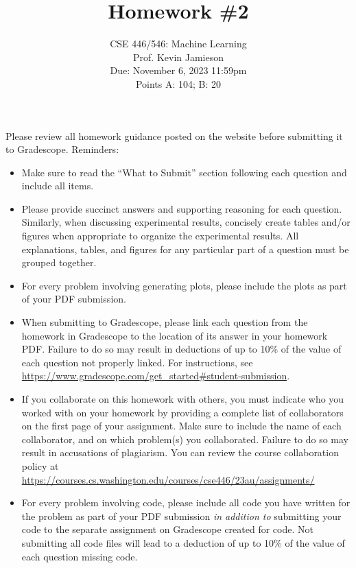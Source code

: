 \documentclass{article}
\begin{document}
\setcounter{aprob}{0}
\title{Homework \#2}
\author{
    \normalsize{CSE 446/546: Machine Learning}\\
    \normalsize{Prof. Kevin Jamieson}\\
    \normalsize{Due: November 6, 2023 11:59pm}\\
    \normalsize{Points A: 104; B: 20}
}
\date{{}}
\maketitle

\noindent Please review all homework guidance posted on the website before submitting it to Gradescope. Reminders:
\begin{itemize}
    \item Make sure to read the ``What to Submit'' section following each question and include all items.
    \item Please provide succinct answers and supporting reasoning for each question. Similarly, when discussing experimental results, concisely create tables and/or figures when appropriate to organize the experimental results. All explanations, tables, and figures for any particular part of a question must be grouped together.
    \item For every problem involving generating plots, please include the plots as part of your PDF submission.
    \item When submitting to Gradescope, please link each question from the homework in Gradescope to the location of its answer in your homework PDF. Failure to do so may result in deductions of up to 10\% of the value of each question not properly linked. For instructions, see \url{https://www.gradescope.com/get_started#student-submission}.
    \item If you collaborate on this homework with others, you must indicate who you worked with on your homework by providing a complete list of collaborators on the first page of your assignment. Make sure to include the name of each collaborator, and on which problem(s) you collaborated. Failure to do so may result in accusations of plagiarism. You can review the course collaboration policy at \url{https://courses.cs.washington.edu/courses/cse446/23au/assignments/}
    \item For every problem involving code, please include all code you have written for the problem as part of your PDF submission \emph{in addition to} submitting your code to the separate assignment on Gradescope created for code. Not submitting all code files will lead to a deduction of up to 10\% of the value of each question missing code.  
\end{itemize}
\end{document}
